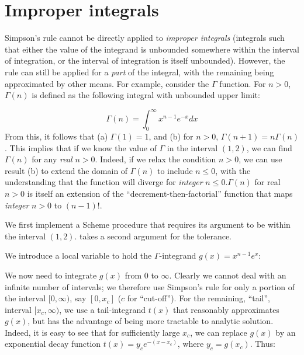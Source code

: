 \section{Improper integrals}

Simpson’s rule cannot be directly applied to {\em
improper integrals} (integrals such that either
the value of the integrand is unbounded somewhere
within the interval of integration, or the interval of
integration is itself unbounded).  However, the rule can still be 
applied for a {\em part} of the integral, with the
remaining being approximated by other means.  For
example, consider the $\Gamma$ function.
For $n > 0$, $\Gamma(n)$ is defined as the
following integral with unbounded upper limit:

$$ \Gamma(n) = \int_0^{\infty} x^{n-1}e^{-x} dx $$
%
From this, it follows that (a) $\Gamma(1) = 1$, and (b)
for $n > 0$, $\Gamma(n+1) = n\Gamma(n)$.  This implies
that if we know the value of $\Gamma$ in the interval
$(1, 2)$, we can find $\Gamma(n)$ for any {\em real} $n > 0$.
Indeed, if we relax the condition $n > 0$, we can use
result (b) to extend the domain of $\Gamma(n)$ to
include $n \le 0$, with the understanding that the function
will diverge for {\em integer} $n \le 0$.\f{$\Gamma(n)$ for real $n > 0$ is
itself an extension of the “decrement-then-factorial” function
that maps {\em integer} $n > 0$ to $(n-1)!$.}

We first implement a Scheme procedure 
that requires its argument  to be within the
interval $(1, 2)$.   takes a
second argument  for the tolerance.


\n
We introduce a local variable  to hold
the $\Gamma$-integrand $g(x) = x^{n-1}e^x$:

             
\n We now need to integrate $g(x)$ from 0 to $\infty$.
Clearly we cannot deal with an infinite number of
intervals; we therefore use Simpson’s rule for only a
portion of the interval $[0, \infty)$, say $[0, x_c]$
($c$ for “cut-off”).  For the remaining, “tail”,
interval $[x_c, \infty)$, we use a tail-integrand
$t(x)$ that reasonably approximates $g(x)$, but has the
advantage of being more tractable to analytic solution.
Indeed, it is easy to see that for sufficiently large
$x_c$, we can replace $g(x)$ by an exponential decay
function $t(x) = y_c e^{-(x - x_c )}$, where $y_c
= g(x_c)$.  Thus:

